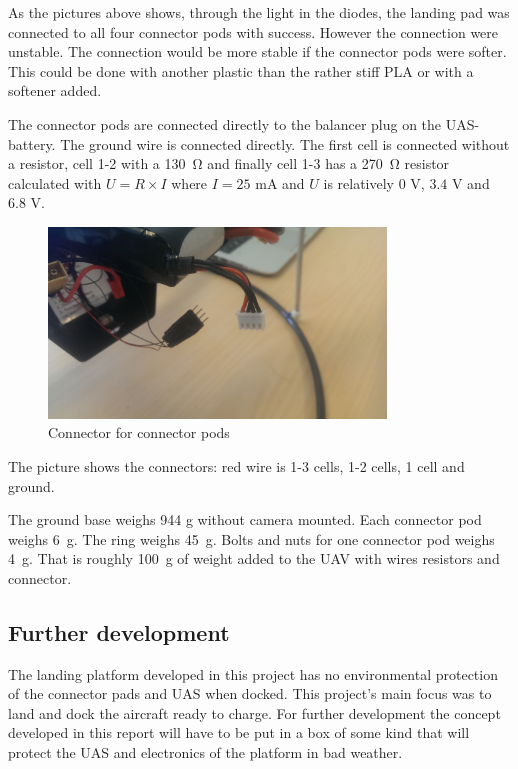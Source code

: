 As the pictures above shows, through the light in the diodes, the landing pad was connected to all four connector pods with success. However the connection were unstable. The connection would be more stable if the connector pods were softer. This could be done with another plastic than the rather stiff PLA or with a softener added.

The connector pods are connected directly to the balancer plug on the UAS-battery. The ground wire is connected directly. The first cell is connected without a resistor, cell 1-2 with a \SI{130}{\ohm} and finally cell 1-3 has a \SI{270}{\ohm} resistor calculated with $U=R\times I$ where $I=25$ \si{\milli\ampere} and $U$ is relatively $0$ \si{\volt}, $3.4$ \si{\volt} and $6.8$ \si{\volt}.

\begin{figure}
	\centering
	\includegraphics[width=0.8\textwidth]{imgs/battery_balancer_connector}
	\caption{Connector for connector pods}
\end{figure}
The picture shows the connectors: red wire is 1-3 cells, 1-2 cells, 1 cell and ground.

The ground base weighs 944 g without camera mounted.
Each connector pod weighs \SI{6}{\g}. The ring weighs \SI{45}{\g}. Bolts and nuts for one connector pod weighs \SI{4}{g}. That is roughly \SI{100}{g} of weight added to the UAV with wires resistors and connector.


\subsection{Further development}
The landing platform developed in this project has no environmental protection of the connector pads and UAS when docked. This project's main focus was to land and dock the aircraft ready to charge. For further development the concept developed in this report will have to be put in a box of some kind that will protect the UAS and electronics of the platform in bad weather.

